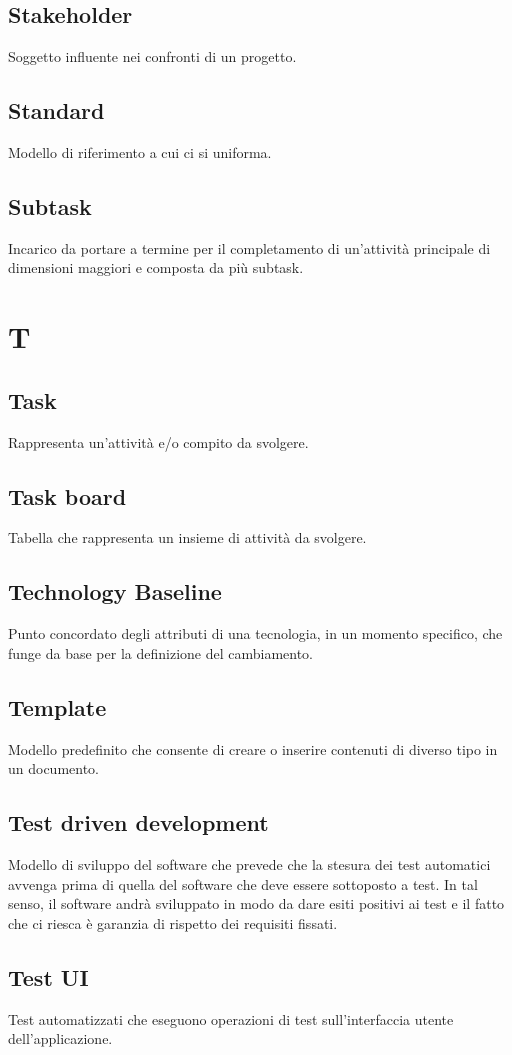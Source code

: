 \subsection*{Stakeholder} Soggetto influente nei confronti di un progetto.
\subsection*{Standard} Modello di riferimento a cui ci si uniforma.
\subsection*{Subtask} Incarico da portare a termine per il completamento di un'attività principale di dimensioni maggiori e composta da più subtask.
\newpage
\section{T}
\subsection*{Task} Rappresenta un'attività e/o compito da svolgere.
\subsection*{Task board} Tabella che rappresenta un insieme di attività da svolgere.
\subsection*{Technology Baseline} Punto concordato degli attributi di una tecnologia, in un momento specifico, che funge da base per la definizione del cambiamento.
\subsection*{Template} Modello predefinito che consente di creare o inserire contenuti di diverso tipo in un documento.
\subsection*{Test driven development} Modello di sviluppo del software che prevede che la stesura dei test automatici avvenga prima di quella del software che deve essere sottoposto a test. In tal senso, il software andrà sviluppato in modo da dare esiti positivi ai test e il fatto che ci riesca è garanzia di rispetto dei requisiti fissati.
\subsection*{Test UI} Test automatizzati che eseguono operazioni di test sull'interfaccia utente dell'applicazione.
